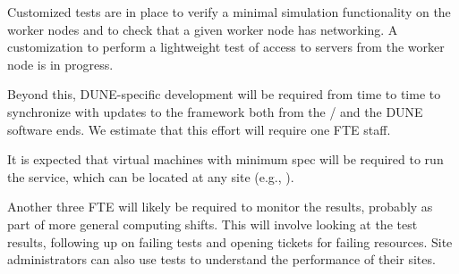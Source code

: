 \documentclass[../main-v1.tex]{subfiles}
\begin{document}

\begin{comment} see below (anne)
Some customization of the tests has been done, and  further changes being planned, which are :
\begin{enumerate}
    \item Minimal simulation to test that a simulation works on the worker nodes (Done)
    \item Checking if a given worker node has ipv6 networking (Done)
    \item Lightweight test of access to rucio servers from the worker node (ongoing)
\end{enumerate}
\end{comment}

Customized tests are in place to verify %
a minimal simulation functionality on the worker nodes and to check that a given worker node has  networking. A customization to perform a lightweight test of access to   servers from the worker node is in progress.

Beyond this, DUNE-specific development will be required from time to time %
to synchronize with updates to the framework both from the  /  and the DUNE software ends. %
We estimate that this effort will require  one FTE staff. %

It is expected that  virtual machines with minimum spec  will be required to run the  service, which can be located at any site (e.g., ).

Another three FTE will likely be required to monitor the  results, probably as part of more general computing shifts. This will involve looking at the test results, following up on failing tests and opening tickets for failing resources. Site administrators can also use  tests to understand the performance of their sites. %
\end{document}
